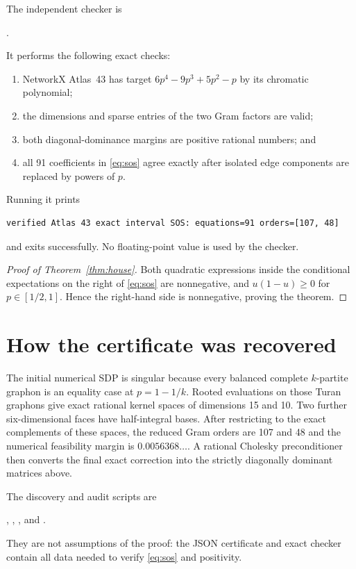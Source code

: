 \documentclass[11pt]{article}
\begin{document}
The independent checker is
\begin{center}
 .
\end{center}
It performs the following exact checks:
\begin{enumerate}
\item NetworkX Atlas~43 has target
      $6p^4-9p^3+5p^2-p$ by its chromatic polynomial;
\item the dimensions and sparse entries of the two Gram factors are valid;
\item both diagonal-dominance margins are positive rational numbers; and
\item all 91 coefficients in \eqref{eq:sos} agree exactly after isolated
      edge components are replaced by powers of $p$.
\end{enumerate}
Running it prints
\begin{verbatim}
verified Atlas 43 exact interval SOS: equations=91 orders=[107, 48]
\end{verbatim}
and exits successfully.  No floating-point value is used by the checker.

\begin{proof}[Proof of Theorem~\ref{thm:house}]
Both quadratic expressions inside the conditional expectations on the right
of \eqref{eq:sos} are nonnegative,
and $u(1-u)\geq0$ for $p\in[1/2,1]$.  Hence the right-hand side is
nonnegative, proving the theorem.
\end{proof}

\section{How the certificate was recovered}

The initial numerical SDP is singular because every balanced complete
$k$-partite graphon is an equality case at $p=1-1/k$.  Rooted evaluations
on those Turan graphons give exact rational kernel spaces of dimensions 15
and 10.  Two further six-dimensional faces have half-integral bases.  After
restricting to the exact complements of these spaces, the reduced Gram
orders are 107 and 48 and the numerical feasibility margin is
$0.0056368\ldots$.  A rational Cholesky preconditioner then converts the
final exact correction into the strictly diagonally dominant matrices above.

The discovery and audit scripts are
\begin{center}
\begin{minipage}{0.9\linewidth}
,
,
, and
.
\end{minipage}
\end{center}
They are not assumptions of the proof: the JSON certificate and exact
checker contain all data needed to verify \eqref{eq:sos} and positivity.
\end{document}
